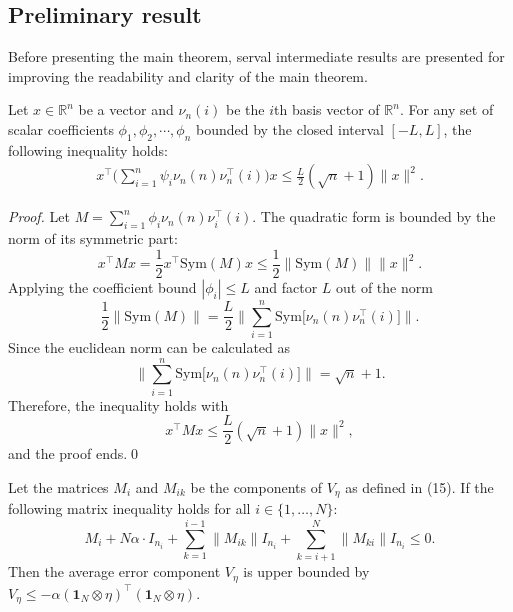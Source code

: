 \documentclass{ifacconf}
\begin{document}
\subsection{Preliminary result}
\vspace*{-0.3 cm}
Before presenting the main theorem, serval intermediate results are presented for improving the readability and clarity of the main theorem.

\begin{proposition}
    \label{prop:nonlinear bound}
    Let $x\in\mathbb{R}^n$ be a vector and $\nu_n(i)$ be the $i$th basis vector of $\mathbb{R}^n$.
    For any set of scalar coefficients $\phi_1,\phi_2,\cdots,\phi_n$ bounded by the closed interval $[-L,L]$, the following inequality holds:
    \begin{equation}
        \begin{aligned}
            x^\top\bigg(\sum^n_{i=1}\psi_i\nu_n(n)\nu_n^\top(i)\bigg)x\le \frac{L}{2}(\sqrt{n}+1)\|x\|^2.
        \end{aligned}\label{eq:nonlinear bound}
    \end{equation}
\end{proposition}
\begin{proof}
Let $M = \sum^n_{i=1}\phi_i\nu_n(n)\nu_i^\top(i)$. The quadratic form is bounded by the norm of its symmetric part:
\[x^\top Mx = \frac{1}{2}x^\top\mathrm{Sym}(M)x\le \frac{1}{2}\big\|\mathrm{Sym}(M)\big\|\|x\|^2.\]
Applying the coefficient bound  $|\phi_i|\le L$ and factor $L$ out of the norm
\[\frac{1}{2}\|\mathrm{Sym}(M)\|=\frac{L}{2}\bigg\|\sum^n_{i=1}\mathrm{Sym}\big[\nu_n(n)\nu_n^\top(i)\big]\bigg\|.\]
Since the euclidean norm can be calculated as \[\Big\|\sum^n_{i=1}\mathrm{Sym}\big[\nu_n(n)\nu_n^\top(i)\big]\Big\|=\sqrt{n}+1.\]
Therefore, the inequality holds with
\[x^\top Mx\le \frac{L}{2}(\sqrt{n}+1)\|x\|^2,\]
and the proof ends.\qed
\end{proof}
\begin{proposition}
    \label{prop:Veta}
        Let the matrices $M_i$ and $M_{ik}$ be the components of $V_\eta$ as defined in (15). If the following matrix inequality holds for all $i \in \{1, \dots, N\}$:
    \begin{equation}
    M_i+N\alpha\cdot I_{n_i} + \sum_{k=1}^{i-1} \big\|M_{ik}\big\| I_{n_i} + \sum_{k=i+1}^{N} \big\|M_{ki}\big\| I_{n_i} \le 0.
    \label{eq:prop eta}
    \end{equation}
    Then the average error component $V_\eta$ is upper bounded by $V_\eta \le -\alpha(\mathbf{1}_N\otimes\eta)^\top(\mathbf{1}_N\otimes\eta)$.    
\end{proposition}
\end{document}

